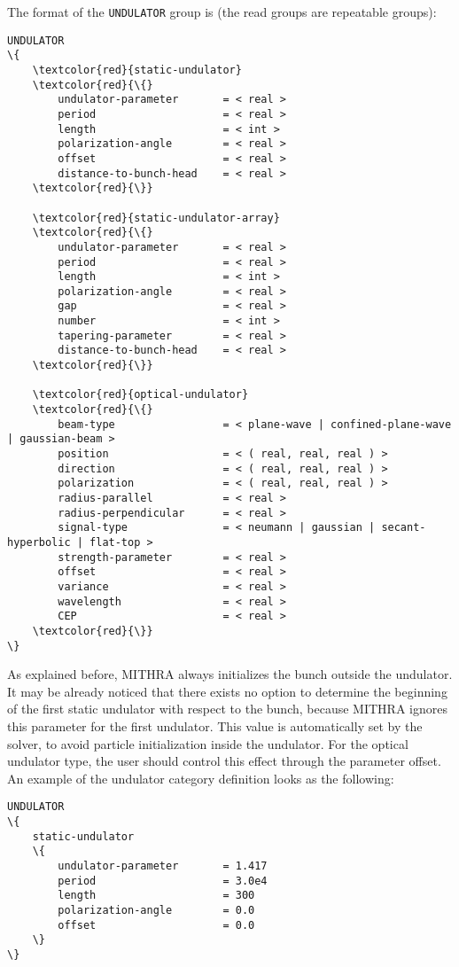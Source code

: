 The format of the \texttt{UNDULATOR} group is (the read groups are repeatable groups):
%
\begin{Verbatim}[frame=single, fontsize=\small, tabsize=4, fontfamily=courier, fontseries=b, commandchars=\\\{\}, obeytabs]
UNDULATOR
\{
	\textcolor{red}{static-undulator}
	\textcolor{red}{\{}
		undulator-parameter		  = < real >
		period					  = < real >
		length					  = < int >
		polarization-angle		  = < real >
		offset					  = < real >
		distance-to-bunch-head 	  = < real >
	\textcolor{red}{\}}

	\textcolor{red}{static-undulator-array}
	\textcolor{red}{\{}
		undulator-parameter		  = < real >
		period					  = < real >
		length					  = < int >
		polarization-angle		  = < real >
		gap						  = < real >
		number					  = < int >
		tapering-parameter		  = < real >
		distance-to-bunch-head    = < real >
	\textcolor{red}{\}}

	\textcolor{red}{optical-undulator}
	\textcolor{red}{\{}
		beam-type				  = < plane-wave | confined-plane-wave | gaussian-beam >
		position				  = < ( real, real, real ) >
		direction				  = < ( real, real, real ) >
		polarization			  = < ( real, real, real ) >
		radius-parallel			  = < real >
		radius-perpendicular	  = < real >
		signal-type				  = < neumann | gaussian | secant-hyperbolic | flat-top >
		strength-parameter		  = < real >
		offset					  = < real >
		variance				  = < real >
		wavelength				  = < real >
		CEP						  = < real >
	\textcolor{red}{\}}
\}
\end{Verbatim}
%
As explained before, MITHRA always initializes the bunch outside the undulator.
%
It may be already noticed that there exists no option to determine the beginning of the first static undulator with respect to the bunch, because MITHRA ignores this parameter for the first undulator.
%
This value is automatically set by the solver, to avoid particle initialization inside the undulator.
%
For the optical undulator type, the user should control this effect through the parameter offset.
%
An example of the undulator category definition looks as the following:
%
\begin{snugshade}
\begin{Verbatim}[fontsize=\small, tabsize=4, fontfamily=courier, fontseries=b, commandchars=\\\{\}, obeytabs]
UNDULATOR
\{
	static-undulator
	\{
		undulator-parameter		  = 1.417
    	period					  = 3.0e4
    	length					  = 300
    	polarization-angle		  = 0.0
    	offset					  = 0.0
    \}
\}
\end{Verbatim}
\end{snugshade}
